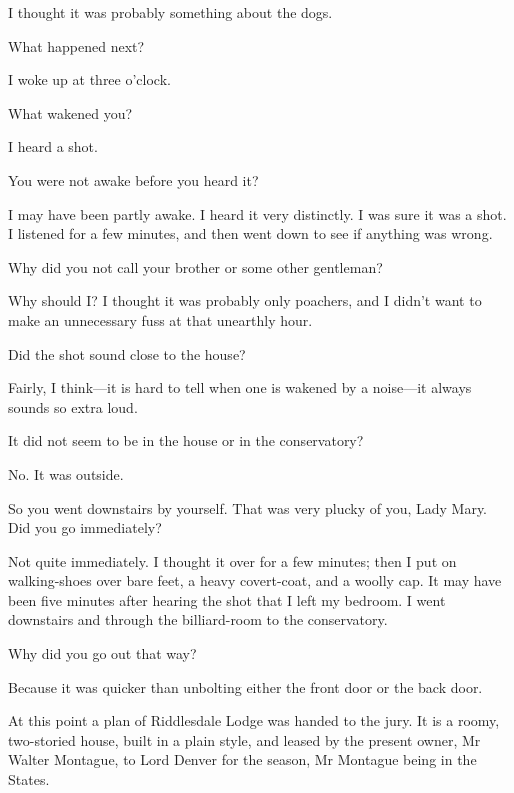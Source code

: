 \begin{dialogue}
  I thought it was probably something about the dogs.

 What happened next?

 I woke up at three o'clock.

 What wakened you?

 I heard a shot.

 You were not awake before you heard it?

 I may have been partly awake. I heard it very distinctly. I was sure it was a shot. I listened for a few minutes, and then went down to see if anything was wrong.

 Why did you not call your brother or some other gentleman?

  Why should I? I thought it was probably only poachers, and I didn't want to make an unnecessary fuss at that unearthly hour.

 Did the shot sound close to the house?

 Fairly, I think\allowbreak---\allowbreak it is hard to tell when one is wakened by a noise\allowbreak---\allowbreak it always sounds so extra loud.

 It did not seem to be in the house or in the conservatory?

 No. It was outside.

 So you went downstairs by yourself. That was very plucky of you, Lady Mary. Did you go immediately?

 Not quite immediately. I thought it over for a few minutes; then I put on walking-shoes over bare feet, a heavy covert-coat, and a woolly cap. It may have been five minutes after hearing the shot that I left my bedroom. I went downstairs and through the billiard-room to the conservatory.

 Why did you go out that way?

 Because it was quicker than unbolting either the front door or the back door.
\end{dialogue}

At this point a plan of Riddlesdale Lodge was handed to the jury. It is a roomy, two-storied house, built in a plain style, and leased by the present owner, Mr Walter Montague, to Lord Denver for the season, Mr  Montague being in the States.

